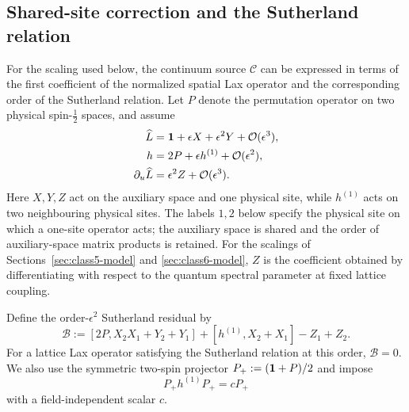 \subsection{Shared-site correction and the Sutherland relation}
\label{sec:shared-site-common-form}

For the scaling used below, the continuum source $\mathcal C$ can be expressed
in terms of the first coefficient of the normalized spatial Lax operator and
the corresponding order of the Sutherland relation.  Let $P$ denote the
permutation operator on two physical spin-$\tfrac12$ spaces, and assume
\begin{align}
\widehat L
&=\mathbf{1}+\epsilon X+\epsilon^2Y+\mathcal O(\epsilon^3),
\nonumber\\
h
&=2P+\epsilon h^{(1)}+\mathcal O(\epsilon^2),
\nonumber\\
\partial_u\widehat L
&=\epsilon^2 Z+\mathcal O(\epsilon^3).
\label{eq:common-operator-expansions}
\end{align}
Here $X,Y,Z$ act on the auxiliary space and one physical site, while
$h^{(1)}$ acts on two neighbouring physical sites.  The labels $1,2$ below
specify the physical site on which a one-site operator acts; the auxiliary
space is shared and the order of auxiliary-space matrix products is retained.
For the scalings of Sections~\ref{sec:class5-model} and
\ref{sec:class6-model}, $Z$ is the coefficient obtained by differentiating
with respect to the quantum spectral parameter at fixed lattice coupling.

Define the order-$\epsilon^2$ Sutherland residual by
\begin{equation}
\mathcal B
:=[2P,X_2X_1+Y_2+Y_1]
+[h^{(1)},X_2+X_1]-Z_1+Z_2.
\label{eq:common-Sutherland-residual}
\end{equation}
For a lattice Lax operator satisfying the Sutherland relation at this order,
$\mathcal B=0$.  We also use the symmetric two-spin projector
$P_+:=(\mathbf{1}+P)/2$ and impose
\begin{equation}
P_+h^{(1)}P_+=cP_+
\label{eq:common-triplet-condition}
\end{equation}
with a field-independent scalar $c$.

